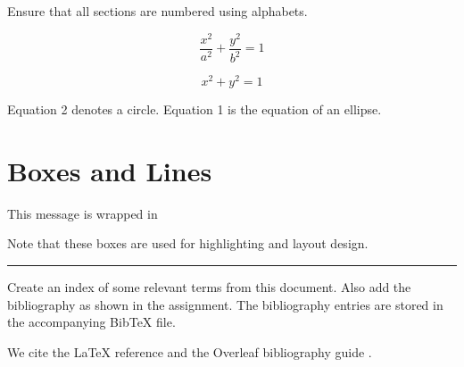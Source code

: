 \documentclass[12pt,a4paper]{article}
\begin{document}
Ensure that all sections are numbered using alphabets.

\begin{equation}
\frac{x^2}{a^2}+\frac{y^2}{b^2}=1
\end{equation}

\begin{equation}
x^2+y^2=1
\end{equation}

Equation 2 denotes a circle. Equation 1 is the equation of an ellipse.

\section{Boxes and Lines}

\noindent\usebox{\messagebox}

\noindent\usebox{\messagebox}

\noindent\usebox{\messagebox}

\vspace{1cm}

This message is wrapped in

\noindent{}

\vspace{0.5cm}

Note that these boxes are used for highlighting and layout design.

\noindent\rule{\textwidth}{0.4pt}

Create an index of some relevant terms from this document. Also add the bibliography as shown in the assignment. The bibliography entries are stored in the accompanying BibTeX file.


We cite the LaTeX reference \cite{oetiker2021notso} and the Overleaf bibliography guide \cite{overleafbibtex}.

\clearpage
\printindex

\clearpage


\end{document}
